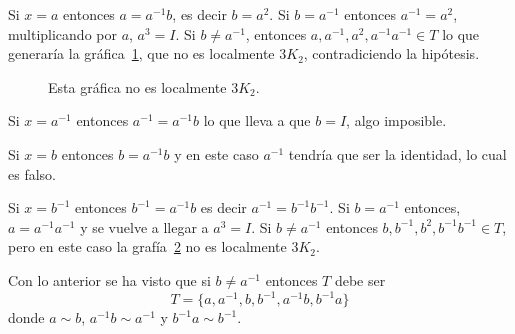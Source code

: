 \documentclass[12pt]{book}
\theoremstyle{definition}
\begin{document}
Si $x=a$ entonces $a=a^{-1}b$, es decir $b=a^2$. Si $b=a^{-1}$
entonces $a^{-1}=a^2$, multiplicando por $a$, $a^3= I$. Si $b \neq
a^{-1}$, entonces $ a, a^{-1}, a^2, a^{-1}a^{-1} \in T$ lo que
generaría la gráfica~\ref{e=a}, que no es localmente $3K_2$,
contradiciendo la hipótesis.



\begin{figure}
  \centering
  \caption{Esta gráfica no es localmente $3K_2$.}\label{e=a}
\end{figure}


Si $x=a^{-1}$ entonces $a^{-1}=a^{-1}b$ lo que lleva a que $b=I$, algo
imposible.


Si $x=b$ entonces $b=a^{-1}b$ y en este caso $a^{-1}$ tendría que ser
la identidad, lo cual es falso.


Si $x=b^{-1}$ entonces $b^{-1}=a^{-1}b$ es decir
$a^{-1}=b^{-1}b^{-1}$. Si $b=a^{-1}$ entonces, $a=a^{-1}a^{-1}$ y se
vuelve a llegar a $a^3=I$. Si $ b\neq a^{-1}$ entonces $b, b^{-1},
b^2, b^{-1}b^{-1}\in T$, pero en este caso la grafía~\ref{e=b-1} no es
localmente $3K_2$.

\begin{figure}
  \centering
  \caption{}\label{e=b-1}
\end{figure}




Con lo anterior se ha visto que si $ b\neq a^{-1}$ entonces $T$ debe
ser $$T=\{a, a^{-1}, b, b^{-1}, a^{-1}b, b^{-1}a\}$$ donde $a\sim b$,
$a^{-1}b\sim a^{-1}$ y $b^{-1}a\sim b^{-1}$.
\end{document}

